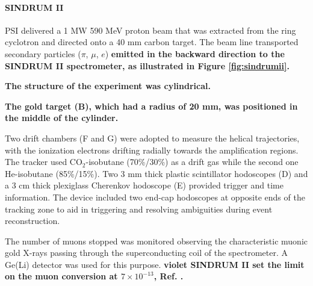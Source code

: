 
\paragraph{SINDRUM II}
PSI delivered a 1 MW 590 MeV proton beam that was extracted from the ring
cyclotron and directed onto a 40 mm carbon target. The beam line
transported secondary particles ($\pi$, $\mu$, $e$)
{\bf \violet emitted in the backward direction to the SINDRUM II spectrometer, as
illustrated in Figure \ref{fig:sindrumii}.}



{\bf \violet The structure of the experiment was cylindrical.}

{\bf \violet The gold target (B), which had a radius of 20 mm, was positioned
in the middle of the cylinder.}

Two drift chambers (F and G) were adopted to measure
the helical trajectories, with the ionization electrons drifting radially towards the amplification 
regions. The tracker used CO$_2$-isobutane (70\%/30\%) as a drift
gas while the second one He-isobutane (85\%/15\%). Two 3 mm thick plastic scintillator hodoscopes (D) and a 3 cm 
thick plexiglass Cherenkov hodoscope (E) provided trigger and time information. 
The device included two end-cap hodoscopes at opposite ends of the tracking zone to aid in triggering 
and resolving ambiguities during event reconstruction.

The number of muons stopped
was monitored observing the characteristic muonic gold X-rays passing through the
superconducting coil of the spectrometer. A Ge(Li) detector was used for this purpose.
{\bf violet SINDRUM II set the limit on the muon conversion at $7 \times 10^{-13}$, Ref. \cite{SINDRUMII:2006dvw}.}

